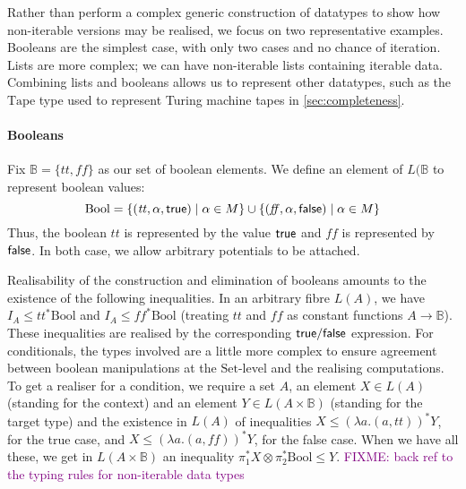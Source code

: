\documentclass[acmsmall,review]{acmart}
\newcommand{\TapeType}{\mathrm{Tape}}
\newcommand{\Set}{\mathrm{Set}}
\newcommand{\bob}[1]{\textcolor{purple}{FIXME: #1}}
\begin{document}
Rather than perform a complex generic construction of datatypes to
show how non-iterable versions may be realised, we focus on two
representative examples. Booleans are the simplest case, with only two
cases and no chance of iteration. Lists are more complex; we can have
non-iterable lists containing iterable data. Combining lists and
booleans allows us to represent other datatypes, such as the
$\TapeType$ type used to represent Turing machine tapes in
\autoref{sec:completeness}.

\paragraph{Booleans} Fix $\mathbb{B} = \{ \mathit{tt}, \mathit{ff} \}$
as our set of boolean elements. We define an element of $L(\mathbb{B}$
to represent boolean values:
\begin{displaymath}
  \mathrm{Bool} = \{ (\mathit{tt}, \alpha, \mathsf{true}) \mid \alpha \in M \} \cup \{ (\mathit{ff}, \alpha, \mathsf{false}) \mid \alpha \in M \}
\end{displaymath}
Thus, the boolean $\mathit{tt}$ is represented by the value $\mathsf{true}$
and $\mathit{ff}$ is represented by $\mathsf{false}$. In both case, we
allow arbitrary potentials to be attached.

Realisability of the construction and elimination of booleans amounts
to the existence of the following inequalities. In an arbitrary fibre
$L(A)$, we have $I_A \leq \mathit{tt}^* \mathrm{Bool}$ and
$I_A \leq \mathit{ff}^* \mathrm{Bool}$ (treating $\mathit{tt}$ and
$\mathit{ff}$ as constant functions $A \to \mathbb{B}$). These
inequalities are realised by the corresponding $\mathsf{true}/\mathsf{false}$
expression. For conditionals, the types involved are a little more
complex to ensure agreement between boolean manipulations at the
$\Set$-level and the realising computations. To get a realiser for a
condition, we require a set $A$, an element $X \in L(A)$ (standing for
the context) and an element $Y \in L(A \times \mathbb{B})$ (standing
for the target type) and the existence in $L(A)$ of inequalities
$X \leq (\lambda a. (a, \mathit{tt}))^* Y$, for the true case, and
$X \leq (\lambda a. (a, \mathit{ff}))^* Y$, for the false case. When
we have all these, we get in $L(A \times \mathbb{B})$ an inequality
$\pi_1^* X \otimes \pi_2^* \mathrm{Bool} \leq Y$. \bob{back ref to the
  typing rules for non-iterable data types}
\end{document}
